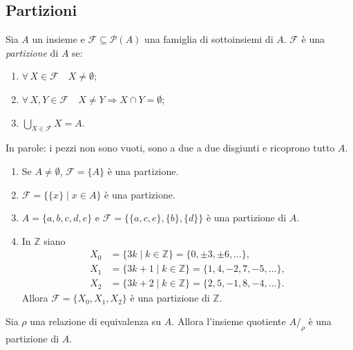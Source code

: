 \documentclass[11pt,a4paper]{article}
\begin{document}
\subsection{Partizioni}

\begin{definizione}
Sia $A$ un insieme e $\mathcal{F} \subseteq \mathcal{P}(A)$ una famiglia di
sottoinsiemi di $A$. $\mathcal{F}$ è una \emph{partizione} di $A$ se:
\begin{enumerate}
    \item $\forall\, X \in \mathcal{F} \quad X \neq \emptyset$;
    \item $\forall\, X, Y \in \mathcal{F} \quad X \neq Y \Rightarrow
          X \cap Y = \emptyset$;
    \item $\displaystyle \bigcup_{X \in \mathcal{F}} X = A$.
\end{enumerate}
\end{definizione}

In parole: i pezzi non sono vuoti, sono a due a due disgiunti e ricoprono
tutto $A$.

\begin{esempio}
\leavevmode
\begin{enumerate}
    \item Se $A \neq \emptyset$, $\mathcal{F} = \{A\}$ è una partizione.
    \item $\mathcal{F} = \{\{x\} \mid x \in A\}$ è una partizione.
    \item $A = \{a, b, c, d, e\}$ e
          $\mathcal{F} = \{\{a, c, e\}, \{b\}, \{d\}\}$ è una partizione
          di $A$.
    \item In $\mathbb{Z}$ siano
          \begin{align*}
          X_0 &= \{3k \mid k \in \mathbb{Z}\} = \{0, \pm 3, \pm 6, \dots\},\\
          X_1 &= \{3k + 1 \mid k \in \mathbb{Z}\}
                = \{1, 4, -2, 7, -5, \dots\},\\
          X_2 &= \{3k + 2 \mid k \in \mathbb{Z}\}
                = \{2, 5, -1, 8, -4, \dots\}.
          \end{align*}
          Allora $\mathcal{F} = \{X_0, X_1, X_2\}$ è una partizione di
          $\mathbb{Z}$.
\end{enumerate}
\end{esempio}

\begin{proposizione}[A]
Sia $\rho$ una relazione di equivalenza su $A$. Allora l'insieme quotiente
$A/_\rho$ è una partizione di $A$.
\end{proposizione}
\end{document}
